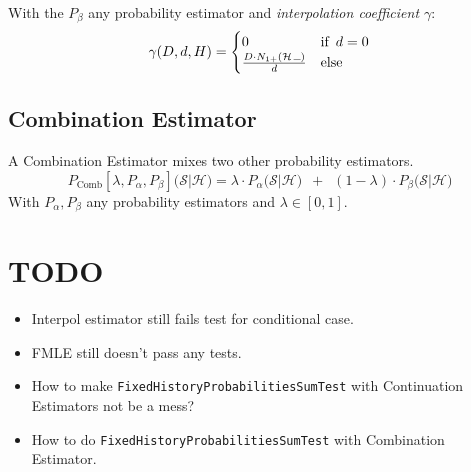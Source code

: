 \documentclass[11pt,a4paper]{article}
\newcommand{\Seq}{\mathcal{S}}
\newcommand{\Hist}{\mathcal{H}}
\newcommand{\SmallSkp}{\rule{5pt}{.3pt}}
\begin{document}
  With the $P_\beta$ any probability estimator and
  \emph{interpolation coefficient $\gamma$}:
  \begin{equation}
    \gamma(D,d,H) = \begin{cases}
      0 & \text{if} \enspace d = 0 \\
      \frac{D \cdot N_{1+}(\Hist \, \SmallSkp)}{d} & \text{else}
    \end{cases}
  \end{equation}

  \subsection{Combination Estimator}

  A Combination Estimator mixes two other probability estimators.
  \begin{equation}
    P_\mathrm{Comb}{\scriptstyle[\lambda,P_\alpha,P_\beta]}\big(\Seq | \Hist\big) = \lambda \cdot P_\alpha\big(\Seq | \Hist\big) \enspace + \enspace (1 - \lambda) \cdot P_\beta\big(\Seq | \Hist\big)
  \end{equation}
  With $P_\alpha,P_\beta$ any probability estimators and $\lambda \in [0,1]$.

  \section{TODO}

  \begin{itemize}
    \item Interpol estimator still fails test for conditional case.
    \item FMLE still doesn't pass any tests.
    \item How to make \texttt{FixedHistoryProbabilitiesSumTest} with Continuation Estimators not be a mess?
    \item How to do \texttt{FixedHistoryProbabilitiesSumTest} with Combination Estimator.
  \end{itemize}
\end{document}
